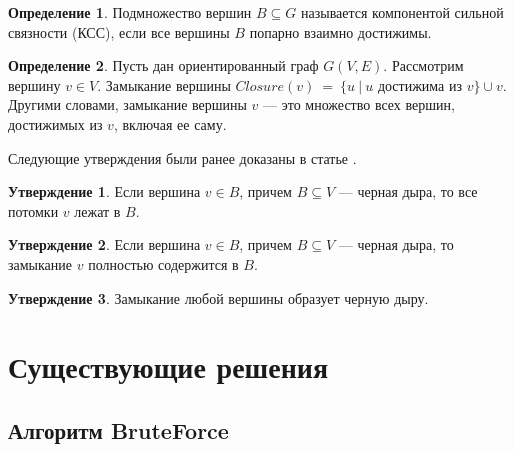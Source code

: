 \documentclass[12pt,a4paper,oneside,openany]{article}
\theoremstyle{definition}
\newtheorem{definition}{Определение}[]
\theoremstyle{lemma}
\newtheorem{lemma}{Утверждение}[]
\theoremstyle{remark}
\begin{document}
\begin{definition}\label{def:scc}
Подмножество вершин $B \subseteq G$ называется компонентой сильной связности (КСС), если все вершины $B$ попарно взаимно достижимы.
\end{definition}

\begin{definition}\label{def:closure}
Пусть дан ориентированный граф $G(V,E)$. Рассмотрим вершину $v \in V$. Замыкание вершины $Closure(v)\ =\ \{u\ |\ u$ достижима из $v\} \cup {v}$.
Другими словами, замыкание вершины $v$ --- это множество всех вершин, достижимых из $v$, включая ее саму.
\end{definition}

Следующие утверждения были ранее доказаны в статье \cite{li2010detecting}.

\begin{lemma}
Если вершина $v \in B$, причем $B \subseteq V$ --- черная дыра, то все потомки $v$ лежат в $B$.
\end{lemma}

\begin{lemma}
Если вершина $v \in B$, причем $B \subseteq V$ --- черная дыра, то замыкание $v$ полностью содержится в $B$.
\end{lemma}

\begin{lemma}\label{lemma:closurebh}
Замыкание любой вершины образует черную дыру.
\end{lemma}


\cleardoublepage
\section{Существующие решения}\label{sec:prevsolutions}

\subsection{Алгоритм BruteForce}\label{subsec:bruteforce}
\end{document}

